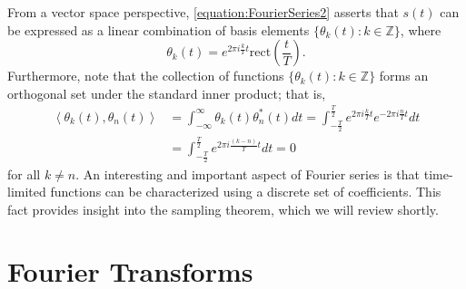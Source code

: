 From a vector space perspective, \eqref{equation:FourierSeries2} asserts that $s(t)$ can be expressed as a linear combination of basis elements $\{ \theta_k (t) : k \in \mathbb{Z} \}$, where
\begin{equation*}
\theta_k (t) = e^{2 \pi i \frac{k}{T} t} \mathrm{rect} \left(\frac{t}{T} \right) .
\end{equation*}
Furthermore, note that the collection of functions $\{ \theta_k (t) : k \in \mathbb{Z} \}$ forms an orthogonal set under the standard inner product; that is,
\begin{equation*}
\begin{split}
\left\langle \theta_k(t), \theta_n(t) \right\rangle
&= \int_{-\infty}^{\infty} \theta_k(t) \theta_n^*(t) dt
= \int_{-\frac{T}{2}}^{\frac{T}{2}} e^{2 \pi i \frac{k}{T} t}
e^{- 2 \pi i \frac{n}{T} t} dt \\
&= \int_{-\frac{T}{2}}^{\frac{T}{2}} e^{2 \pi i \frac{(k-n)}{T} t} dt
= 0
\end{split}
\end{equation*}
for all $k \neq n$.
An interesting and important aspect of Fourier series is that time-limited functions can be characterized using a discrete set of coefficients.
This fact provides insight into the sampling theorem, which we will review shortly.


\section{Fourier Transforms}

